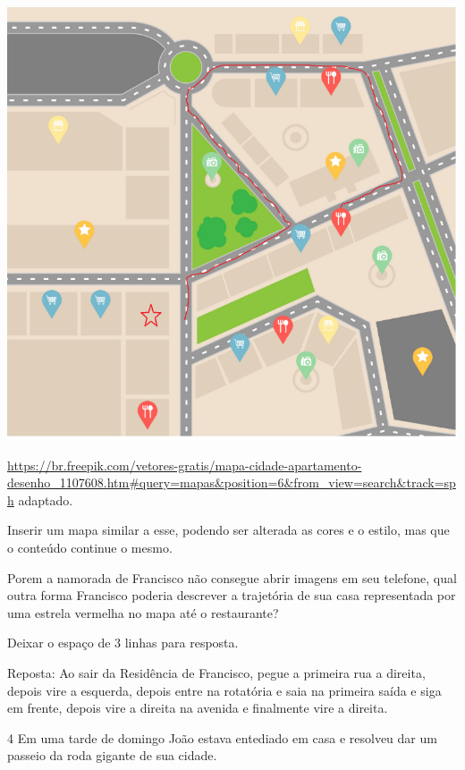 \includegraphics[width=3\times 55in,height=3\times 406in]{./imgSAEB_8_MAT/media/image37.png}

\url{https://br.freepik.com/vetores-gratis/mapa-cidade-apartamento-desenho_1107608.htm\#query=mapas\&position=6\&from_view=search\&track=sph}
adaptado.

Inserir um mapa similar a esse, podendo ser alterada as cores e o
estilo, mas que o conteúdo continue o mesmo.

Porem a namorada de Francisco não consegue abrir imagens em seu
telefone, qual outra forma Francisco poderia descrever a trajetória de
sua casa representada por uma estrela vermelha no mapa até o
restaurante?

Deixar o espaço de 3 linhas para resposta.

Reposta: Ao sair da Residência de Francisco, pegue a primeira rua a
direita, depois vire a esquerda, depois entre na rotatória e saia na
primeira saída e siga em frente, depois vire a direita na avenida e
finalmente vire a direita.

\num{4} Em uma tarde de domingo João estava entediado em casa e resolveu dar
um passeio da roda gigante de sua cidade.

